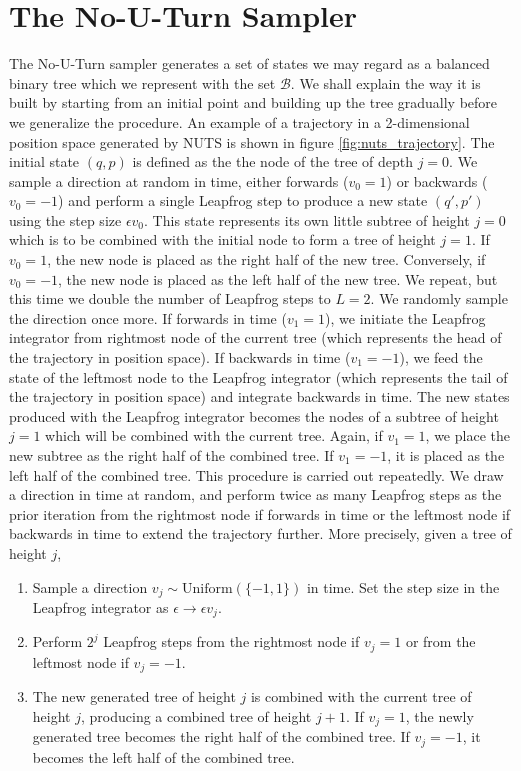 \section{The No-U-Turn Sampler}
The No-U-Turn sampler generates a set of states we may regard as a balanced binary tree which we represent with the set $\mathcal{B}$. 
We shall explain the way it is built by starting from an initial point and building up the tree gradually before we generalize the procedure. An example of a trajectory in a 2-dimensional position space generated by NUTS is shown in figure \ref{fig:nuts_trajectory}. 
The initial state $(q, p)$ is defined as the the node of the tree of depth $j = 0$. We sample a direction at random in time, either forwards ($v_0 = 1$) or backwards ($v_0 = -1$) and perform a single Leapfrog step to produce a new state $(q', p')$ using the step size $\epsilon v_0$. This state represents its own little subtree of height $j = 0$ which is to be combined with the initial node to form a tree of height $j = 1$. If $v_0 = 1$, the new node is placed as the right half of the new tree. Conversely, if $v_0 = -1$, the new node is placed as the left half of the new tree. We repeat, but this time we double the number of Leapfrog steps to $L = 2$. We randomly sample the direction once more. If forwards in time ($v_1 = 1$), we initiate the Leapfrog integrator from rightmost node of the current tree (which represents the head of the trajectory in position space). If backwards in time ($v_1 = -1$), we feed the state of the leftmost node to the Leapfrog integrator (which represents the tail of the trajectory in position space) and integrate backwards in time. The new states produced with the Leapfrog integrator becomes the nodes of a subtree of height $j = 1$ which will be combined with the current tree. Again, if $v_1 = 1$, we place the new subtree as the right half of the combined tree. If $v_1 = -1$, it is placed as the left half of the combined tree. 
This procedure is carried out repeatedly. We draw a direction in time at random, and perform twice as many Leapfrog steps as the prior iteration from the rightmost node if forwards in time or the leftmost node if backwards in time to extend the trajectory further. More precisely, given a tree of height $j$, 
\begin{enumerate}
    \item Sample a direction $v_j \sim \text{Uniform}(\{-1, 1\})$ in time. Set the step size in the Leapfrog integrator as $\epsilon \to \epsilon v_j$.
    \item Perform $2^j$ Leapfrog steps from the rightmost node if $v_j = 1$ or from the leftmost node if $v_j = -1$.  
    \item The new generated tree of height $j$ is combined with the current tree of height $j$, producing a combined tree of height $j + 1$. If $v_j = 1$, the newly generated tree becomes the right half of the combined tree. If $v_j = -1$, it becomes the left half of the combined tree.
\end{enumerate}
